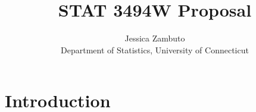 \documentclass[12pt]{article}
\title{STAT 3494W Proposal}
\author{Jessica Zambuto\\
Department of Statistics, University of Connecticut}
\begin{document}
\maketitle
\section*{Introduction}
\label{sec:intro}
\end{document}

